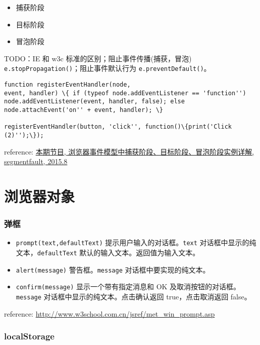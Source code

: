 \begin{itemize}
\tightlist
\item
  捕获阶段
\item
  目标阶段
\item
  冒泡阶段
\end{itemize}

TODO：IE 和 w3c 标准的区别；阻止事件传播(捕获，冒泡)
\texttt{e.stopPropagation()}；阻止事件默认行为
\texttt{e.preventDefault()}。

\begin{verbatim}function registerEventHandler(node,
event, handler) \{ if (typeof node.addEventListener == 'function'')
node.addEventListener(event, handler, false); else
node.attachEvent('on'' + event, handler); \}

registerEventHandler(button, 'click'', function()\{print('Click
(2)'');\}); 
\end{verbatim}

reference: \href{http://segmentfault.com/a/1190000003482372}{本期节目,
浏览器事件模型中捕获阶段、目标阶段、冒泡阶段实例详解, segmentfault,
2015.8}

\section{浏览器对象}\label{ux6d4fux89c8ux5668ux5bf9ux8c61}

\subsubsection{弹框}\label{ux5f39ux6846}

\begin{itemize}
\tightlist
\item
  \texttt{prompt(text,defaultText)} 提示用户输入的对话框。\texttt{text}
  对话框中显示的纯文本，\texttt{defaultText}
  默认的输入文本。返回值为输入文本。
\item
  \texttt{alert(message)} 警告框。\texttt{message}
  对话框中要实现的纯文本。
\item
  \texttt{confirm(message)} 显示一个带有指定消息和 OK
  及取消按钮的对话框。\texttt{message}
  对话框中显示的纯文本。点击确认返回 true，点击取消返回 false。
\end{itemize}

reference: \url{http://www.w3school.com.cn/jsref/met_win_prompt.asp}

\subsubsection{localStorage}\label{localstorage}

